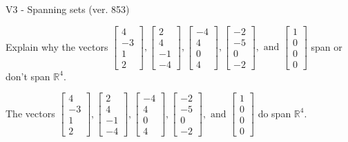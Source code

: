 \begin{exercise}
  \begin{exerciseTitle}V3 - Spanning sets (ver. 853)\end{exerciseTitle}
  \begin{exerciseStatement}
    Explain why the vectors \(\left[\begin{array}{r}
4 \\
-3 \\
1 \\
2
\end{array}\right] , \left[\begin{array}{r}
2 \\
4 \\
-1 \\
-4
\end{array}\right] , \left[\begin{array}{r}
-4 \\
4 \\
0 \\
4
\end{array}\right] , \left[\begin{array}{r}
-2 \\
-5 \\
0 \\
-2
\end{array}\right] , \text{ and } \left[\begin{array}{r}
1 \\
0 \\
0 \\
0
\end{array}\right]\) span or don't span \(\mathbb{R}^4\). 
	


  \end{exerciseStatement}
  \begin{exerciseAnswer}
   The vectors \(\left[\begin{array}{r}
4 \\
-3 \\
1 \\
2
\end{array}\right] , \left[\begin{array}{r}
2 \\
4 \\
-1 \\
-4
\end{array}\right] , \left[\begin{array}{r}
-4 \\
4 \\
0 \\
4
\end{array}\right] , \left[\begin{array}{r}
-2 \\
-5 \\
0 \\
-2
\end{array}\right] , \text{ and } \left[\begin{array}{r}
1 \\
0 \\
0 \\
0
\end{array}\right]\) 
  	 do  
	span \(\mathbb{R}^4\).
  


  \end{exerciseAnswer}
\end{exercise}
